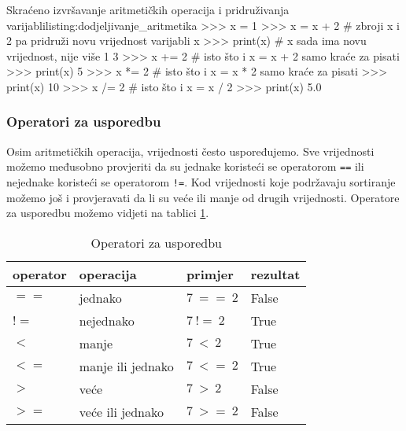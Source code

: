 \begin{python}{Skraćeno izvršavanje aritmetičkih operacija i pridruživanja varijabli}{listing:dodjeljivanje_aritmetika}
>>> x = 1
>>> x = x + 2  # zbroji x i 2 pa pridruži novu vrijednost varijabli x
>>> print(x)   # x sada ima novu vrijednost, nije više 1
3
>>> x += 2  # isto što i x = x + 2 samo kraće za pisati
>>> print(x)
5
>>> x *= 2  # isto što i x = x * 2 samo kraće za pisati
>>> print(x)
10
>>> x /= 2 # isto što i x = x / 2
>>> print(x)
5.0
\end{python}


\subsubsection{Operatori za usporedbu}

Osim aritmetičkih operacija, vrijednosti često  uspoređujemo. Sve vrijednosti možemo međusobno provjeriti da su jednake koristeći se operatorom \texttt{==} ili nejednake koristeći se operatorom \texttt{!=}. Kod vrijednosti koje podržavaju sortiranje možemo još i provjeravati da li su veće ili manje od drugih vrijednosti. Operatore za usporedbu možemo vidjeti na tablici \ref{tab:operatori-usporedba}.


\begin{table}[h!]
    \begin{center}
        \caption{Operatori za usporedbu}
        \label{tab:operatori-usporedba}
        \begin{tabular}{llll}
        	\textbf{operator}   & \textbf{operacija} & \textbf{primjer} & \textbf{rezultat} \\ \hline
        	$\boldsymbol{==}$   & jednako            & $7\:==\:2$       & False             \\
        	$\boldsymbol{!\!=}$ & nejednako          & $7\:!\!=\:2$     & True              \\
        	$\boldsymbol{<}$    & manje              & $7\:<\:2$        & True              \\
        	$\boldsymbol{<\!=}$ & manje ili jednako  & $7\:<\!=\:2$     & True              \\
        	$\boldsymbol{>}$    & veće               & $7\:>\:2$        & False             \\
        	$\boldsymbol{>\!=}$ & veće ili jednako   & $7\:>\!=\:2$     & False
        \end{tabular}
    \end{center}
\end{table}

